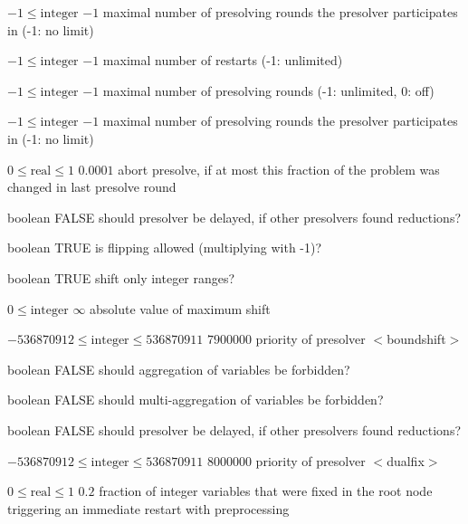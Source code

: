 %
{$-1\leq\textrm{integer}$}%
{$-1$}%
{maximal number of presolving rounds the presolver participates in (-1: no limit)}%
{}

%
{$-1\leq\textrm{integer}$}%
{$-1$}%
{maximal number of restarts (-1: unlimited)}%
{}

%
{$-1\leq\textrm{integer}$}%
{$-1$}%
{maximal number of presolving rounds (-1: unlimited, 0: off)}%
{}

%
{$-1\leq\textrm{integer}$}%
{$-1$}%
{maximal number of presolving rounds the presolver participates in (-1: no limit)}%
{}

%
{$0\leq\textrm{real}\leq1$}%
{$0.0001$}%
{abort presolve, if at most this fraction of the problem was changed in last presolve round}%
{}

%
{boolean}%
{FALSE}%
{should presolver be delayed, if other presolvers found reductions?}%
{}

%
{boolean}%
{TRUE}%
{is flipping allowed (multiplying with -1)?}%
{}

%
{boolean}%
{TRUE}%
{shift only integer ranges?}%
{}

%
{$0\leq\textrm{integer}$}%
{$\infty$}%
{absolute value of maximum shift}%
{}

%
{$-536870912\leq\textrm{integer}\leq536870911$}%
{$7900000$}%
{priority of presolver $<$boundshift$>$}%
{}

%
{boolean}%
{FALSE}%
{should aggregation of variables be forbidden?}%
{}

%
{boolean}%
{FALSE}%
{should multi-aggregation of variables be forbidden?}%
{}

%
{boolean}%
{FALSE}%
{should presolver be delayed, if other presolvers found reductions?}%
{}

%
{$-536870912\leq\textrm{integer}\leq536870911$}%
{$8000000$}%
{priority of presolver $<$dualfix$>$}%
{}

%
{$0\leq\textrm{real}\leq1$}%
{$0.2$}%
{fraction of integer variables that were fixed in the root node triggering an immediate restart with preprocessing}%
{}

